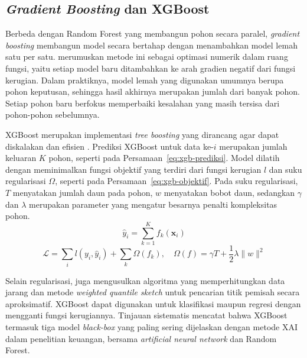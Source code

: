 \subsection{\emph{Gradient Boosting} dan XGBoost}

Berbeda dengan Random Forest yang membangun pohon secara paralel, \emph{gradient boosting} membangun model secara bertahap dengan menambahkan model lemah satu per satu. \textcite{friedman2001} merumuskan metode ini sebagai optimasi numerik dalam ruang fungsi, yaitu setiap model baru ditambahkan ke arah gradien negatif dari fungsi kerugian. Dalam praktiknya, model lemah yang digunakan umumnya berupa pohon keputusan, sehingga hasil akhirnya merupakan jumlah dari banyak pohon. Setiap pohon baru berfokus memperbaiki kesalahan yang masih tersisa dari pohon-pohon sebelumnya.

XGBoost merupakan implementasi \emph{tree boosting} yang dirancang agar dapat diskalakan dan efisien \autocite{chen2016}. Prediksi XGBoost untuk data ke-$i$ merupakan jumlah keluaran $K$ pohon, seperti pada Persamaan~\ref{eq:xgb-prediksi}. Model dilatih dengan meminimalkan fungsi objektif yang terdiri dari fungsi kerugian $l$ dan suku regularisasi $\Omega$, seperti pada Persamaan~\ref{eq:xgb-objektif}. Pada suku regularisasi, $T$ menyatakan jumlah daun pada pohon, $w$ menyatakan bobot daun, sedangkan $\gamma$ dan $\lambda$ merupakan parameter yang mengatur besarnya penalti kompleksitas pohon.
\begin{equation}
\hat{y}_i = \sum_{k=1}^{K} f_k(\mathbf{x}_i)
\label{eq:xgb-prediksi}
\end{equation}
\begin{equation}
\mathcal{L} = \sum_{i} l\left(y_i, \hat{y}_i\right) + \sum_{k} \Omega(f_k), \quad \Omega(f) = \gamma T + \frac{1}{2} \lambda \lVert w \rVert^2
\label{eq:xgb-objektif}
\end{equation}

Selain regularisasi, \textcite{chen2016} juga mengusulkan algoritma yang memperhitungkan data jarang dan metode \emph{weighted quantile sketch} untuk pencarian titik pemisah secara aproksimatif. XGBoost dapat digunakan untuk klasifikasi maupun regresi dengan mengganti fungsi kerugiannya. Tinjauan sistematis \textcite{cerneviciene2024} mencatat bahwa XGBoost termasuk tiga model \emph{black-box} yang paling sering dijelaskan dengan metode XAI dalam penelitian keuangan, bersama \emph{artificial neural network} dan Random Forest.

